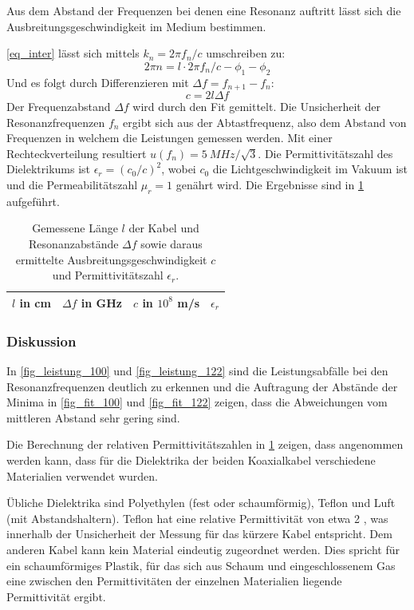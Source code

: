 \documentclass[
	a4paper,
	12pt,
	pagesize,
	ngerman
]{scrartcl}
\begin{document}
	Aus dem Abstand der Frequenzen bei denen eine Resonanz auftritt lässt sich die Ausbreitungsgeschwindigkeit im Medium bestimmen.

	\cref{eq_inter} lässt sich mittels $k_n = 2\pi f_n/c$ umschreiben zu:
	\begin{equation}
		2\pi n = l\cdot2\pi f_n /c -\phi_1 - \phi_2
	\end{equation}
	Und es folgt durch Differenzieren mit $\Delta f = f_{n+1}-f_n$:
	\begin{equation}
	c = 2l\Delta f
	\end{equation}
	Der Frequenzabstand $\Delta f$ wird durch den Fit gemittelt.
	Die Unsicherheit der Resonanzfrequenzen $f_n$ ergibt sich aus der Abtastfrequenz, also dem Abstand von Frequenzen in welchem die Leistungen gemessen werden.
	Mit einer Rechteckverteilung resultiert $u(f_n)= \SI{5}{MHz}/\sqrt{3}$.
	Die Permittivitätszahl des Dielektrikums ist $\epsilon_r=(c_0/c)^2$, wobei $c_0$ die Lichtgeschwindigkeit im Vakuum ist und die Permeabilitätszahl $\mu_r=1$ genährt wird.
	Die Ergebnisse sind in \cref{tb_res} aufgeführt.

\begin{table}[H]
	\centering
	\begin{tabular}{ c | c | c | c }
		 $l$ in \si{cm} & $\Delta f$ in \si{GHz} &  $c$ in $10^8$ \si{m/s} & $\epsilon_r$ \\ \hline
		 
	\end{tabular}
	\caption{
	Gemessene Länge $l$ der Kabel und Resonanzabstände $\Delta f$ sowie daraus ermittelte Ausbreitungsgeschwindigkeit $c$ und Permittivitätszahl $\epsilon_r$.
	}
	\label{tb_res}
\end{table}
	\subsubsection*{Diskussion}

	In \cref{fig_leistung_100} und \cref{fig_leistung_122} sind die Leistungsabfälle bei den Resonanzfrequenzen deutlich zu erkennen und die Auftragung der Abstände der Minima in \cref{fig_fit_100} und \cref{fig_fit_122} zeigen, dass die Abweichungen vom mittleren Abstand sehr gering sind.

	Die Berechnung der relativen Permittivitätszahlen in \cref{tb_res} zeigen, dass angenommen werden kann, dass für die Dielektrika der beiden Koaxialkabel verschiedene Materialien verwendet wurden.

	Übliche Dielektrika sind Polyethylen (fest oder schaumförmig), Teflon und Luft (mit Abstandshaltern).
	Teflon hat eine relative Permittivität von etwa \SI{2}{} \cite{Hippel}, was innerhalb der Unsicherheit der Messung für das kürzere Kabel entspricht.
	Dem anderen Kabel kann kein Material eindeutig zugeordnet werden.
	Dies spricht für ein schaumförmiges Plastik, für das sich aus Schaum und eingeschlossenem Gas eine zwischen den Permittivitäten der einzelnen Materialien liegende Permittivität ergibt.
\end{document}
